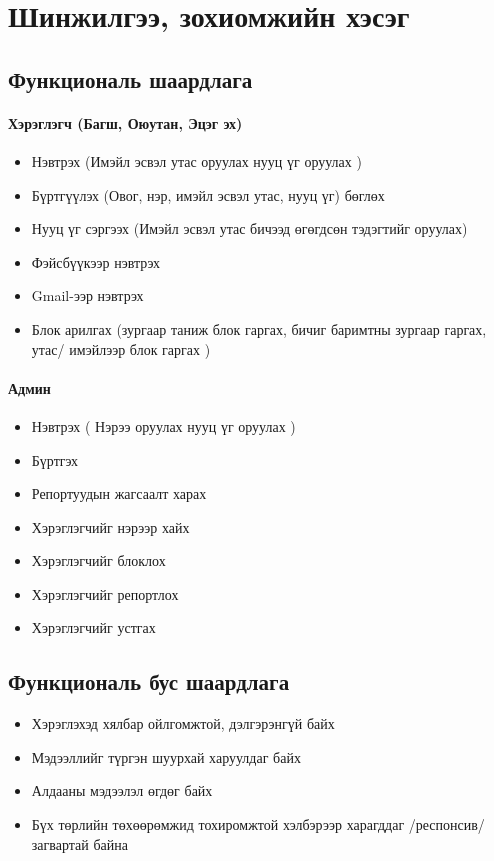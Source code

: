 \documentclass[
oneside, %
english, %
onehalfspacing, %
nolistspacing, %
headsepline, %
]{article} %
\begin{document}

	
	\newpage
	\section{Шинжилгээ, зохиомжийн хэсэг}
	\subsection{Функциональ шаардлага}
	\paragraph {Хэрэглэгч (Багш, Оюутан, Эцэг эх)}
	\begin{itemize}
		
	\item Нэвтрэх (Имэйл эсвэл утас оруулах нууц үг оруулах )
	\item Бүртгүүлэх (Овог, нэр, имэйл эсвэл утас, нууц үг) бөглөх
	\item Нууц үг сэргээх (Имэйл эсвэл утас бичээд өгөгдсөн тэдэгтийг оруулах)
	\item Фэйсбүүкээр нэвтрэх 
	\item Gmail-ээр нэвтрэх
	\item Блок арилгах (зургаар таниж блок гаргах, бичиг баримтны зургаар гаргах, утас/ имэйлээр блок гаргах )
	
     \end{itemize}
     \paragraph {Админ}
     \begin{itemize}
 	
 	\item Нэвтрэх ( Нэрээ оруулах нууц үг оруулах )
 	\item Бүртгэх
 	\item Репортуудын жагсаалт харах
 	\item Хэрэглэгчийг нэрээр хайх
 	\item Хэрэглэгчийг блоклох
 	\item Хэрэглэгчийг репортлох
 	\item Хэрэглэгчийг устгах
 
 	
    \end{itemize}
	\subsection{Функциональ бус шаардлага}
	\begin{itemize}
		\item Хэрэглэхэд хялбар ойлгомжтой, дэлгэрэнгүй байх
		\item Мэдээллийг түргэн шуурхай харуулдаг байх
		\item Алдааны мэдээлэл өгдөг байх 
		\item Бүх төрлийн төхөөрөмжид тохиромжтой хэлбэрээр харагддаг /респонсив/ загвартай байна
	\end{itemize}
	
\end{document}
